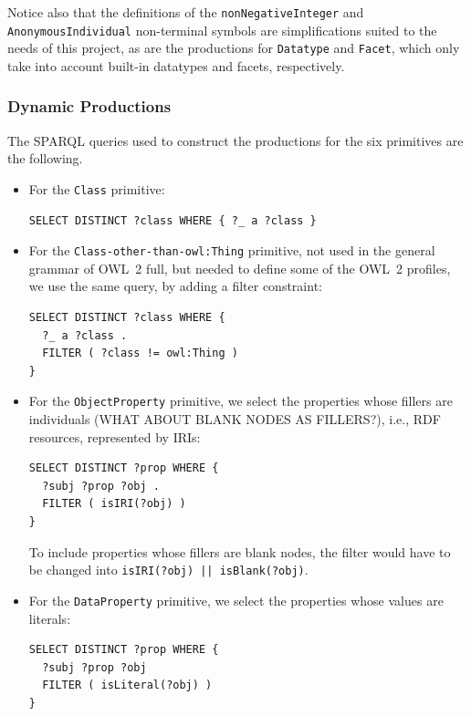 \documentclass[a4paper]{article}
\newcounter{ex}
\begin{document}
Notice also that the definitions of the \texttt{nonNegativeInteger} and \texttt{AnonymousIndividual}
non-terminal symbols are simplifications suited to the needs of this project, as are
the productions for \texttt{Datatype} and \texttt{Facet}, which only take into account
built-in datatypes and facets, respectively.

\subsubsection{Dynamic Productions}

The SPARQL queries used to construct the productions for the six primitives are
the following.
\begin{itemize}

\item For the \texttt{Class} primitive:
\begin{verbatim}
SELECT DISTINCT ?class WHERE { ?_ a ?class }\end{verbatim}

\item For the \texttt{Class-other-than-owl:Thing} primitive, not used in the general
grammar of OWL~2 full, but needed to define some of the OWL~2 profiles, we use the same
query, by adding a filter constraint:
\begin{verbatim}
SELECT DISTINCT ?class WHERE {
  ?_ a ?class .
  FILTER ( ?class != owl:Thing )
}\end{verbatim}

\item For the \texttt{ObjectProperty} primitive, we select the properties whose
fillers are individuals (WHAT ABOUT BLANK NODES AS FILLERS?),
i.e., RDF resources, represented by IRIs:
\begin{verbatim}
SELECT DISTINCT ?prop WHERE {
  ?subj ?prop ?obj .
  FILTER ( isIRI(?obj) )
}\end{verbatim}
To include properties whose fillers are blank nodes, the filter would have to be
changed into \texttt{isIRI(?obj) || isBlank(?obj)}.

\item For the \texttt{DataProperty} primitive, we select the properties whose values
are literals:
\begin{verbatim}
SELECT DISTINCT ?prop WHERE {
  ?subj ?prop ?obj
  FILTER ( isLiteral(?obj) )
}\end{verbatim}


\end{itemize}
\end{document}
